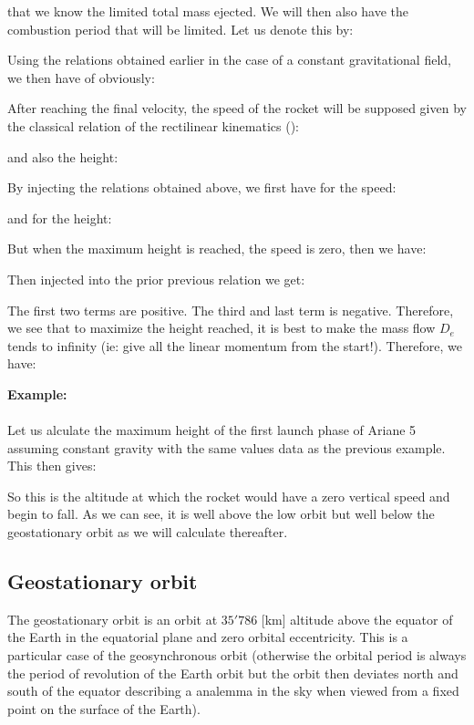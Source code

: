	that we know the limited total mass ejected. We will then also have the combustion period that will be limited. Let us denote this by:
	
	Using the relations obtained earlier in the case of a constant gravitational field, we then have of obviously:
	
	After reaching the final velocity, the speed of the rocket will be supposed given by the classical relation of the rectilinear kinematics ():
	
	and also the height:
	
	By injecting the relations obtained above, we first have for the speed:
	
	and for the height:
	
	But when the maximum height is reached, the speed is zero, then we have:
	
	Then injected into the prior previous relation we get:
	
	The first two terms are positive. The third and last term is negative. Therefore, we see that to maximize the height reached, it is best to make the mass flow $D_e$ tends to infinity (ie: give all the linear momentum from the start!). Therefore, we have:
	
	\begin{tcolorbox}[colframe=black,colback=white,sharp corners]
	\textbf{{\Large {}}Example:}\\\\
	Let us alculate the maximum height of the first launch phase of Ariane 5 assuming constant gravity with the same values data as the previous example. This then gives:
	
	So this is the altitude at which the rocket would have a zero vertical speed and begin to fall. As we can see, it is well above the low orbit but well below the geostationary orbit as we will calculate thereafter.
	\end{tcolorbox}
	
	\subsection{Geostationary orbit}
	The geostationary orbit is an orbit at $35'786$ [km] altitude above the equator of the Earth in the equatorial plane and zero orbital eccentricity. This is a particular case of the geosynchronous orbit (otherwise the orbital period is always the period of revolution of the Earth orbit but the orbit then deviates north and south of the equator describing a analemma in the sky when viewed from a fixed point on the surface of the Earth).
	
